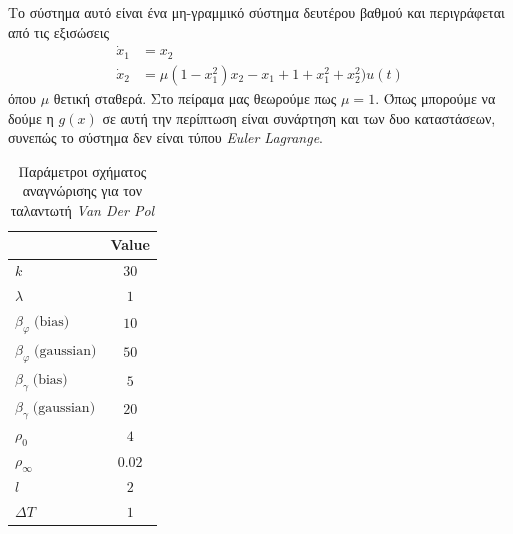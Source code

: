Το σύστημα αυτό είναι ένα μη-γραμμικό σύστημα δευτέρου βαθμού και περιγράφεται από τις εξισώσεις
\begin{equation}
\begin{split}
\dot{x}_1 &= x_2 \\
\dot{x}_2 &= \mu (1-x_1^2)x_2 - x_1 + 1+x_1^2+x_2^2)u(t)
\end{split}
\end{equation}
όπου $\mu$ θετική σταθερά. Στο πείραμα μας θεωρούμε πως $\mu = 1$. Όπως μπορούμε να δούμε η $g(x)$ σε αυτή την περίπτωση είναι συνάρτηση και των δυο καταστάσεων, συνεπώς το σύστημα δεν είναι τύπου \textit{Euler Lagrange}.


{\begin{table}
		\centering
		\captionsetup{format=plain}
		\caption{Παράμετροι σχήματος αναγνώρισης για τον ταλαντωτή \textit{Van Der Pol}}
		\label{tab:vdp_schema_params}
		\begin{tabular}{ l | c }
			\hline\hline
			\text{Parameter} & Value \\ \hline\hline
			$k$             & $30$   \\ \hline
			$\lambda$       & $1 $   \\ \hline
			$\beta_{\varphi} \;\text{(bias)}$     & $10$ \\ \hline
			$\beta_{\varphi} \;\text{(gaussian)}$ & $50$ \\ \hline
			$\beta_{\gamma} \;\text{(bias)}$     & $5$ \\ \hline
			$\beta_{\gamma} \;\text{(gaussian)}$ & $20$ \\ \hline
			$\rho_0      $ & $4$  \\ \hline
			$\rho_\infty $ & $0.02$  \\ \hline
			$l           $ & $2$  \\ \hline
			$\textit{ΔΤ} $  & $1$ 	\\ \hline \hline	
		\end{tabular}
	\end{table}

}
